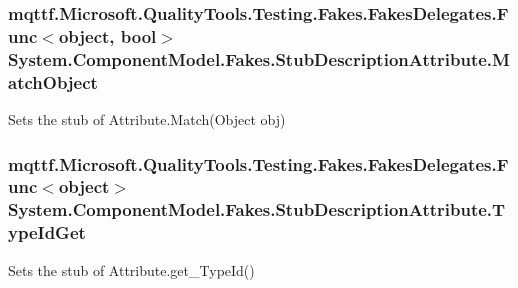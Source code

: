 \hypertarget{class_system_1_1_component_model_1_1_fakes_1_1_stub_description_attribute_a7f294be9524d61d66c215d256c29b890}{
\subsubsection[{Match\-Object}]{\setlength{\rightskip}{0pt plus 5cm}mqttf.\-Microsoft.\-Quality\-Tools.\-Testing.\-Fakes.\-Fakes\-Delegates.\-Func$<$object, bool$>$ System.\-Component\-Model.\-Fakes.\-Stub\-Description\-Attribute.\-Match\-Object}}\label{class_system_1_1_component_model_1_1_fakes_1_1_stub_description_attribute_a7f294be9524d61d66c215d256c29b890}


Sets the stub of Attribute.\-Match(\-Object obj)

\hypertarget{class_system_1_1_component_model_1_1_fakes_1_1_stub_description_attribute_afa776d2a9ee7a1b23bded038f104039e}{
\subsubsection[{Type\-Id\-Get}]{\setlength{\rightskip}{0pt plus 5cm}mqttf.\-Microsoft.\-Quality\-Tools.\-Testing.\-Fakes.\-Fakes\-Delegates.\-Func$<$object$>$ System.\-Component\-Model.\-Fakes.\-Stub\-Description\-Attribute.\-Type\-Id\-Get}}\label{class_system_1_1_component_model_1_1_fakes_1_1_stub_description_attribute_afa776d2a9ee7a1b23bded038f104039e}


Sets the stub of Attribute.\-get\-\_\-\-Type\-Id()




